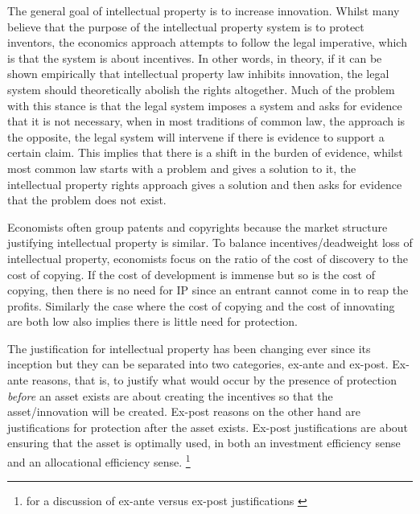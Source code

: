 \documentclass[12pt]{article}
\numberwithin{equation}{section}
\begin{document}
The general goal of intellectual property is to increase innovation. Whilst many believe that the purpose of the intellectual property system is to protect inventors, the economics approach attempts to follow the legal imperative, which is that the system is about incentives. In other words, in theory, if it can be shown empirically that intellectual property law inhibits innovation, the legal system should theoretically abolish the rights altogether. Much of the problem with this stance is that the legal system imposes a system and asks for evidence that it is not necessary, when in most traditions of common law, the approach is the opposite, the legal system will intervene if there is evidence to support a certain claim. This implies that there is a shift in the burden of evidence, whilst most common law starts with a problem and gives a solution to it, the intellectual property rights approach gives a solution and then asks for evidence that the problem does not exist. 

Economists often group patents and copyrights because the market structure justifying intellectual property is similar. To balance incentives/deadweight loss of intellectual property, economists focus on the ratio of the cost of discovery to the cost of copying. If the cost of development is immense but so is the cost of copying, then there is no need for IP since an entrant cannot come in to reap the profits. Similarly the case where the cost of copying and the cost of innovating are both low also implies there is little need for protection. 


The justification for intellectual property has been changing ever since its inception but they can be separated into two categories, ex-ante and ex-post. Ex-ante reasons, that is, to justify what would occur by the presence of protection \textit{before} an asset exists are about creating the incentives so that the asset/innovation will be created. Ex-post reasons on the other hand are justifications for protection after the asset exists. Ex-post justifications are about ensuring that the asset is optimally used, in both an investment efficiency sense and an allocational efficiency sense. \footnote{for a discussion of ex-ante versus ex-post justifications \cite{Lemleyt2004}}
\end{document}
